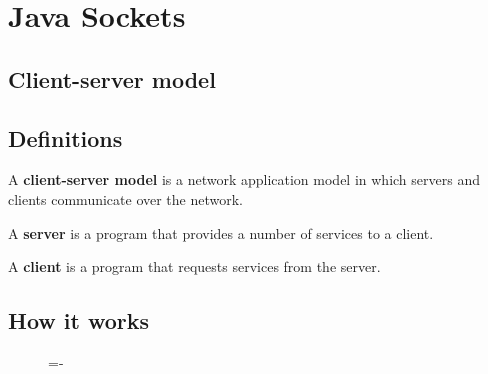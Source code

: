 \documentclass[a4paper]{systems-software}
\begin{document}
\chapter{Java Sockets}

\section{Client-server model}

\section*{Definitions}

A \textbf{client-server model} is a network application model in which servers and clients communicate over the network.

A \textbf{server} is a program that provides a number of services to a client.

A \textbf{client} is a program that requests services from the server.


\section*{How it works}

\begin{figure}[H]
	\lineskip=-\fboxrule
\end{figure}
\end{document}
